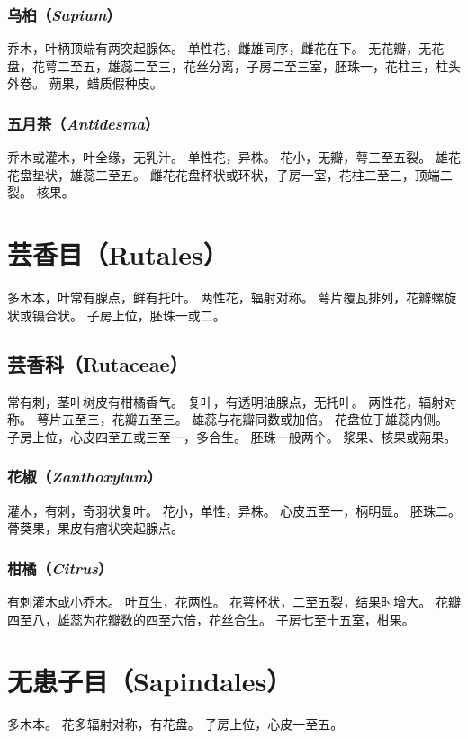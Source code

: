 \documentclass[11pt]{article}
\begin{document}
\begin{sloppypar}
\subsubsection{乌桕（\textit{Sapium}）}
乔木，叶柄顶端有两突起腺体。
单性花，雌雄同序，雌花在下。
无花瓣，无花盘，花萼二至五，雄蕊二至三，花丝分离，子房二至三室，胚珠一，花柱三，柱头外卷。
蒴果，蜡质假种皮。

\subsubsection{五月茶（\textit{Antidesma}）}
乔木或灌木，叶全缘，无乳汁。
单性花，异株。
花小，无瓣，萼三至五裂。
雄花花盘垫状，雄蕊二至五。
雌花花盘杯状或环状，子房一室，花柱二至三，顶端二裂。
核果。

\section{芸香目（Rutales）}
多木本，叶常有腺点，鲜有托叶。
两性花，辐射对称。
萼片覆瓦排列，花瓣螺旋状或镊合状。
子房上位，胚珠一或二。

\subsection{芸香科（Rutaceae）}
常有刺，茎叶树皮有柑橘香气。
复叶，有透明油腺点，无托叶。
两性花，辐射对称。
萼片五至三，花瓣五至三。
雄蕊与花瓣同数或加倍。
花盘位于雄蕊内侧。
子房上位，心皮四至五或三至一，多合生。
胚珠一般两个。
浆果、核果或蒴果。

\subsubsection{花椒（\textit{Zanthoxylum}）}
灌木，有刺，奇羽状复叶。
花小，单性，异株。
心皮五至一，柄明显。
胚珠二。
蓇葖果，果皮有瘤状突起腺点。

\subsubsection{柑橘（\textit{Citrus}）}
有刺灌木或小乔木。
叶互生，花两性。
花萼杯状，二至五裂，结果时增大。
花瓣四至八，雄蕊为花瓣数的四至六倍，花丝合生。
子房七至十五室，柑果。

\section{无患子目（Sapindales）}
多木本。
花多辐射对称，有花盘。
子房上位，心皮一至五。


\end{sloppypar}
\end{document}
